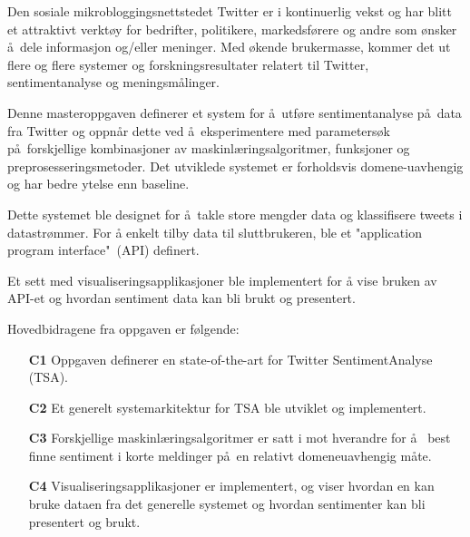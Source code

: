 Den sosiale mikrobloggingsnettstedet Twitter er i kontinuerlig vekst og har blitt et attraktivt verkt\o y for bedrifter, politikere, markedsf\o rere og andre som \o nsker \aa~dele informasjon og/eller meninger. Med \o kende brukermasse, kommer det ut flere og flere systemer og forskningsresultater relatert til Twitter, sentimentanalyse og meningsm\aa linger.

Denne masteroppgaven definerer et system for \aa~utf\o re sentimentanalyse p\aa~data fra Twitter og oppn\aa r dette ved \aa~eksperimentere med parameters\o k p\aa~forskjellige kombinasjoner av maskinl\ae ringsalgoritmer, funksjoner og preprosesseringsmetoder. Det utviklede systemet er forholdsvis domene-uavhengig og har bedre ytelse enn baseline.

Dette systemet ble designet for \aa~takle store mengder data og klassifisere tweets i datastr\o mmer. For {\aa} enkelt tilby data til sluttbrukeren, ble et "application program interface"~(API) definert.

Et sett med visualiseringsapplikasjoner ble implementert for {\aa} vise bruken av API-et og hvordan sentiment data kan bli brukt og presentert.

Hovedbidragene fra oppgaven er f\o lgende:

\begin{itemize}
\item[\textbf{C1}] Oppgaven definerer en state-of-the-art for Twitter SentimentAnalyse (TSA).

\item[\textbf{C2}] Et generelt systemarkitektur for TSA ble utviklet og implementert.

\item[\textbf{C3}] Forskjellige maskinl\ae ringsalgoritmer er satt i mot hverandre for \aa~ best finne sentiment i korte meldinger p\aa~en relativt domeneuavhengig m{\aa}te.

\item[\textbf{C4}] Visualiseringsapplikasjoner er implementert, og viser hvordan en kan bruke dataen fra det generelle systemet og hvordan sentimenter kan bli presentert og brukt.
\end{itemize}

\clearpage